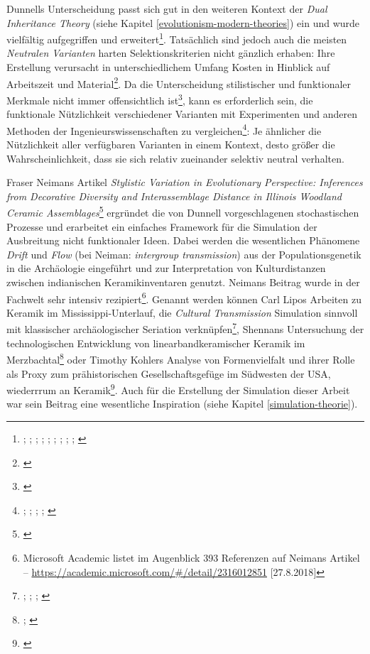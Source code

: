 \documentclass[openany,twoside,twocolumn]{book}
\let\rmarkdownfootnote\footnote%
\def\footnote{\protect\rmarkdownfootnote}
\begin{document}
Dunnells Unterscheidung passt sich gut in den weiteren Kontext der
\emph{Dual Inheritance Theory} (siehe Kapitel
\ref{evolutionism-modern-theories}) ein und wurde vielfältig
aufgegriffen und erweitert\footnote{\textcite{lipo_population_1997};
  \textcite{lipo_science_2001}; \textcite{lyman_measuring_2000};
  \textcite{neiman_conspicuous_1997-1};
  \textcite{neiman_stylistic_1995}; \textcite{rindos_darwinian_1985};
  \textcite{rindos_undirected_1989}; \textcite{rogers_natural_2008};
  \textcite{shennan_ceramic_2001}; \textcite{teltser_culture_1995}}.
Tatsächlich sind jedoch auch die meisten \emph{Neutralen Varianten}
harten Selektionskriterien nicht gänzlich erhaben: Ihre Erstellung
verursacht in unterschiedlichem Umfang Kosten in Hinblick auf
Arbeitszeit und Material\footnote{\textcite{meltzer_study_1981}}. Da die
Unterscheidung stilistischer und funktionaler Merkmale nicht immer
offensichtlich ist\footnote{\textcite{bettinger_style_1996}}, kann es
erforderlich sein, die funktionale Nützlichkeit verschiedener Varianten
mit Experimenten und anderen Methoden der Ingenieurswissenschaften zu
vergleichen\footnote{\textcite{kornbacher_building_2001};
  \textcite{obrien_evolutionary_1994}; \textcite{obrien_variation_1990};
  \textcite{pfeffer_engineering_2001-1};
  \textcite{wilhelmsen_building_2001}}: Je ähnlicher die Nützlichkeit
aller verfügbaren Varianten in einem Kontext, desto größer die
Wahrscheinlichkeit, dass sie sich relativ zueinander selektiv neutral
verhalten.

Fraser Neimans Artikel \emph{Stylistic Variation in Evolutionary
Perspective: Inferences from Decorative Diversity and Interassemblage
Distance in Illinois Woodland Ceramic Assemblages}\footnote{\textcite{neiman_stylistic_1995}}
ergründet die von Dunnell vorgeschlagenen stochastischen Prozesse und
erarbeitet ein einfaches Framework für die Simulation der Ausbreitung
nicht funktionaler Ideen. Dabei werden die wesentlichen Phänomene
\emph{Drift} und \emph{Flow} (bei Neiman: \emph{intergroup
transmission}) aus der Populationsgenetik in die Archäologie eingeführt
und zur Interpretation von Kulturdistanzen zwischen indianischen
Keramikinventaren genutzt. Neimans Beitrag wurde in der Fachwelt sehr
intensiv rezipiert\footnote{Microsoft Academic listet im Augenblick 393
  Referenzen auf Neimans Artikel --
  \url{https://academic.microsoft.com/\#/detail/2316012851}
  {[}27.8.2018{]}}. Genannt werden können Carl Lipos Arbeiten zu Keramik
im Mississippi-Unterlauf, die \emph{Cultural Transmission} Simulation
sinnvoll mit klassischer archäologischer Seriation verknüpfen\footnote{\textcite{lipo_community_2001};
  \textcite{lipo_neutralitystyle_2001}; \textcite{lipo_population_1997};
  \textcite{lipo_science_2001}}, Shennans Untersuchung der
technologischen Entwicklung von linearbandkeramischer Keramik im
Merzbachtal\footnote{\textcite{bentley_cultural_2003};
  \textcite{shennan_ceramic_2001}} oder Timothy Kohlers Analyse von
Formenvielfalt und ihrer Rolle als Proxy zum prähistorischen
Gesellschaftsgefüge im Südwesten der USA, wiederrrum an
Keramik\footnote{\textcite{kohler_vessels_2004-1}}. Auch für die
Erstellung der Simulation dieser Arbeit war sein Beitrag eine
wesentliche Inspiration (siehe Kapitel \ref{simulation-theorie}).
\end{document}
